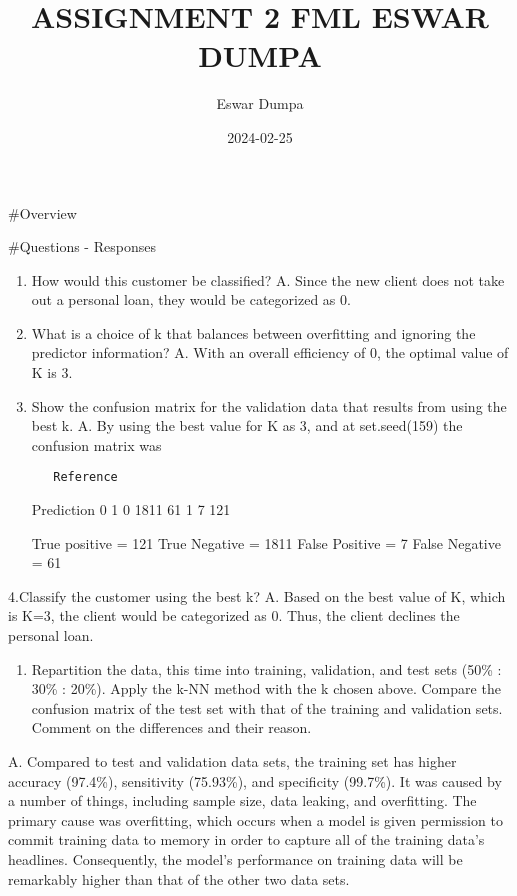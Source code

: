 \documentclass[
]{article}
\title{ASSIGNMENT 2 FML ESWAR DUMPA}
\author{Eswar Dumpa}
\date{2024-02-25}
\providecommand{\tightlist}{%
  \setlength{\itemsep}{0pt}\setlength{\parskip}{0pt}}
\begin{document}
\maketitle

\#Overview

\#Questions - Responses

\begin{enumerate}
\def\labelenumi{\arabic{enumi}.}
\item
  How would this customer be classified? A. Since the new client does
  not take out a personal loan, they would be categorized as 0.
\item
  What is a choice of k that balances between overfitting and ignoring
  the predictor information? A. With an overall efficiency of 0, the
  optimal value of K is 3.
\item
  Show the confusion matrix for the validation data that results from
  using the best k. A. By using the best value for K as 3, and at
  set.seed(159) the confusion matrix was

\begin{verbatim}
   Reference
\end{verbatim}

  Prediction 0 1 0 1811 61 1 7 121

  True positive = 121 True Negative = 1811 False Positive = 7 False
  Negative = 61
\end{enumerate}

4.Classify the customer using the best k? A. Based on the best value of
K, which is K=3, the client would be categorized as 0. Thus, the client
declines the personal loan.

\begin{enumerate}
\def\labelenumi{\arabic{enumi}.}
\setcounter{enumi}{4}
\tightlist
\item
  Repartition the data, this time into training, validation, and test
  sets (50\% : 30\% : 20\%). Apply the k-NN method with the k chosen
  above. Compare the confusion matrix of the test set with that of the
  training and validation sets. Comment on the differences and their
  reason.
\end{enumerate}

A. Compared to test and validation data sets, the training set has
higher accuracy (97.4\%), sensitivity (75.93\%), and specificity
(99.7\%). It was caused by a number of things, including sample size,
data leaking, and overfitting. The primary cause was overfitting, which
occurs when a model is given permission to commit training data to
memory in order to capture all of the training data's headlines.
Consequently, the model's performance on training data will be
remarkably higher than that of the other two data sets.
\end{document}
